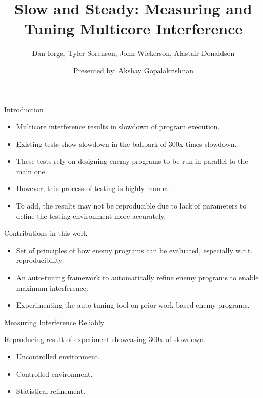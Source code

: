 \documentclass{beamer}
\title{Slow and Steady: Measuring and Tuning Multicore Interference}
\subtitle{Dan Iorga, Tyler Sorenson, John Wickerson, Alastair Donaldson}
\author{Presented by: Akshay Gopalakrishnan}
\begin{document}
    
    \begin{frame}

        \titlepage
    
    \end{frame}

    \begin{frame}{Introduction}

        \begin{itemize}
            \item Multicore interference results in slowdown of program execution.
            \item Existing tests show slowdown in the ballpark of 300x times slowdown.
            \item These tests rely on designing enemy programs to be run in parallel to the main one.
            \item However, this process of testing is highly manual.
            \item To add, the results may not be reproducible due to lack of parameters to define the testing environment more accurately.
        \end{itemize}

    \end{frame}

    \begin{frame}{Contributions in this work}

        \begin{itemize}
            \item Set of principles of how enemy programs can be evaluated, especially w.r.t. reproducibility.
            \item An auto-tuning framework to automatically refine enemy programs to enable maximum interference.
            \item Experimenting the auto-tuning tool on prior work based enemy programs.
        \end{itemize}
    
    \end{frame}

    
    \begin{frame}{Measuring Interference Reliably}

        Reproducing result of experiment showcasing 300x of slowdown.
        \begin{itemize}
            \item Uncontrolled environment.
            \item Controlled environment.
            \item Statistical refinement. 
        \end{itemize}


    \end{frame}
\end{document}
